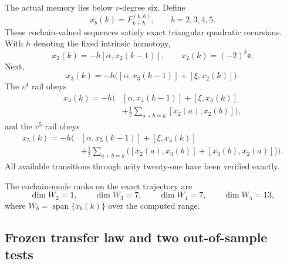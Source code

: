 \documentclass[11pt]{amsart}
\newcommand{\Span}{\operatorname{span}}
\begin{document}
The actual memory lies below $v$-degree six.  Define
\begin{equation}\label{eq:low-rails}
\boxed{x_b(k)=F_{k+b}^{(k,b)},\qquad b=2,3,4,5.}
\end{equation}
These cochain-valued sequences satisfy exact triangular quadratic recursions.  With $h$ denoting the fixed intrinsic homotopy,
\begin{equation}\label{eq:x2-rec}
x_2(k)=-h[\alpha,x_2(k-1)],
\qquad
x_2(k)=(-2)^k\mathsf e.
\end{equation}
Next,
\begin{equation}\label{eq:x3-rec}
x_3(k)=-h\bigl([\alpha,x_3(k-1)]+[\xi,x_2(k)]\bigr).
\end{equation}
The $v^4$ rail obeys
\begin{equation}\label{eq:x4-rec}
\begin{aligned}
x_4(k)=-h\Bigg(&[\alpha,x_4(k-1)]+[\xi,x_3(k)]\\
&+\frac12\sum_{a+b=k}[x_2(a),x_2(b)]\Bigg),
\end{aligned}
\end{equation}
and the $v^5$ rail obeys
\begin{equation}\label{eq:x5-rec}
\begin{aligned}
x_5(k)=-h\Bigg(&[\alpha,x_5(k-1)]+[\xi,x_4(k)]\\
&+\frac12\sum_{a+b=k}
\bigl([x_2(a),x_3(b)]+[x_3(b),x_2(a)]\bigr)\Bigg).
\end{aligned}
\end{equation}
All available transitions through arity twenty-one have been verified exactly.

The cochain-mode ranks on the exact trajectory are
\begin{equation}\label{eq:rail-ranks}
\boxed{
\dim W_2=1,
\qquad
\dim W_3=7,
\qquad
\dim W_4=7,
\qquad
\dim W_5=13,
}
\end{equation}
where $W_b=\Span\{x_b(k)\}$ over the computed range.

\subsection{Frozen transfer law and two out-of-sample tests}
\end{document}
